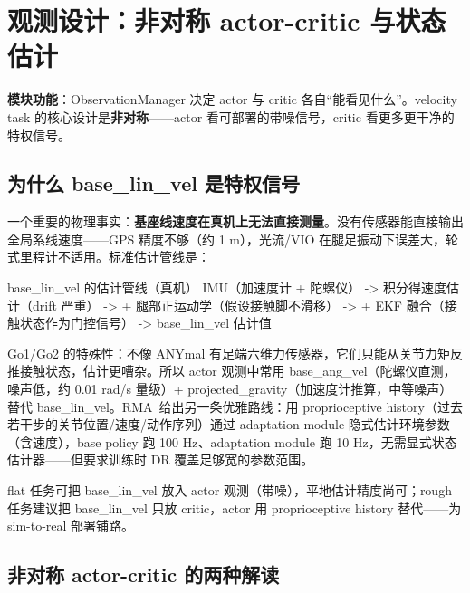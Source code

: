 \section{观测设计：非对称 actor-critic 与状态估计}
\label{sec:rlmc-ql-obs}

\textbf{模块功能}：ObservationManager 决定 actor 与 critic 各自“能看见什么”。velocity task 的核心设计是\textbf{非对称}——actor 看可部署的带噪信号，critic 看更多更干净的特权信号。

\subsection{为什么 base\_lin\_vel 是特权信号}
\label{sec:rlmc-ql-obs-priv}

一个重要的物理事实：\textbf{基座线速度在真机上无法直接测量}。没有传感器能直接输出全局系线速度——GPS 精度不够（约 1 m），光流/VIO 在腿足振动下误差大，轮式里程计不适用。标准估计管线是：

\begin{codebox}{base\_lin\_vel 的估计管线（真机）}
IMU（加速度计 + 陀螺仪）
  -> 积分得速度估计（drift 严重）
  -> + 腿部正运动学（假设接触脚不滑移）
  -> + EKF 融合（接触状态作为门控信号）
  -> base_lin_vel 估计值
\end{codebox}

Go1/Go2 的特殊性：不像 ANYmal 有足端六维力传感器，它们只能从关节力矩反推接触状态，估计更嘈杂。所以 actor 观测中常用 base\_ang\_vel（陀螺仪直测，噪声低，约 0.01 rad/s 量级）+ projected\_gravity（加速度计推算，中等噪声）替代 base\_lin\_vel。RMA\,\cite{kumar2021rma} 给出另一条优雅路线：用 proprioceptive history（过去若干步的关节位置/速度/动作序列）通过 adaptation module 隐式估计环境参数（含速度），base policy 跑 100 Hz、adaptation module 跑 10 Hz，无需显式状态估计器——但要求训练时 DR 覆盖足够宽的参数范围。

\begin{note}
flat 任务可把 base\_lin\_vel 放入 actor 观测（带噪），平地估计精度尚可；rough 任务建议把 base\_lin\_vel 只放 critic，actor 用 proprioceptive history 替代——为 sim-to-real 部署铺路。
\end{note}

\subsection{非对称 actor-critic 的两种解读}
\label{sec:rlmc-ql-obs-asym}

